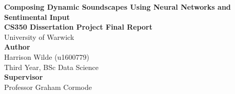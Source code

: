 \documentclass[12pt,]{article}
\title{}
\author{}
\date{}
\begin{document}

\null\vspace{\fill}
\begin{center}
\Huge{\textbf{Composing Dynamic Soundscapes Using Neural Networks and Sentimental Input}}\\
\vspace*{2\baselineskip}
\Large{\textbf{CS350 Dissertation Project Final Report}}\\
University of Warwick\\
\vspace*{2\baselineskip}
\Large{\textbf{Author}}\\
Harrison Wilde (u1600779)\\
Third Year, BSc Data Science\\
\vspace*{2\baselineskip}
\Large{\textbf{Supervisor}}\\
Professor Graham Cormode\\
\vspace*{3\baselineskip}
\end{center}
\vspace{\fill}

\onehalfspacing

\hypersetup{linkcolor = black}
\newpage
{}
\tableofcontents
\newpage
\newpage
\setcounter{page}{3}
\listoffigures 
\newpage

\listoftables
\newpage
\hypersetup{linkcolor = red}


\end{document}
